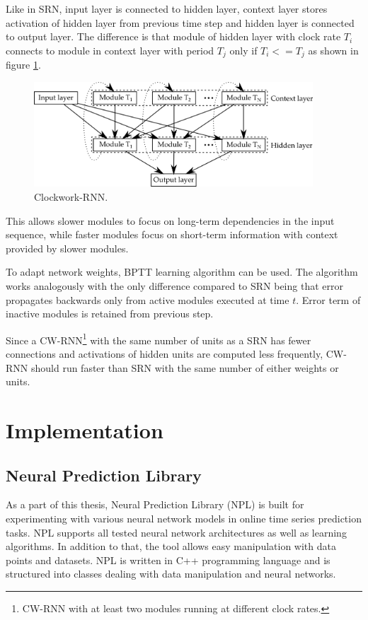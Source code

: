 \documentclass[12pt,oneside]{fithesis2}
\begin{document}
Like in SRN, input layer is connected to hidden layer, context layer stores activation of hidden layer from previous time step and hidden layer is connected to output layer. The difference is that module of hidden layer with clock rate $T_i$ connects to module in context layer with period $T_j$ only if $T_i <= T_j$ as shown in figure \ref{cwrnn}.
	\begin{figure}[ht]
		\centering
		\includegraphics[width=394px]{cw-rnn.png}
		\caption{Clockwork-RNN. }
		\label{cwrnn}
	\end{figure}
This allows slower modules to focus on long-term dependencies in the input sequence, while faster modules focus on short-term information with context provided by slower modules. \par

To adapt network weights, BPTT learning algorithm can be used. The algorithm works analogously with the only difference compared to SRN being that error propagates backwards only from active modules executed at time $t$. Error term of inactive modules is retained from previous step. \par
Since a CW-RNN\footnote{CW-RNN with at least two modules running at different clock rates.} with the same number of units as a SRN has fewer connections and activations of hidden units are computed less frequently, CW-RNN should run faster than SRN with the same number of either weights or units.
      
\chapter{Implementation}
\section{Neural Prediction Library}
As a part of this thesis, Neural Prediction Library (NPL) is built for experimenting with various neural network models in online time series prediction tasks. NPL supports all tested neural network architectures as well as learning algorithms. In addition to that, the tool allows easy manipulation with data points and datasets. NPL is written in C++ programming language and is structured into classes dealing with data manipulation and neural networks.
\end{document}
